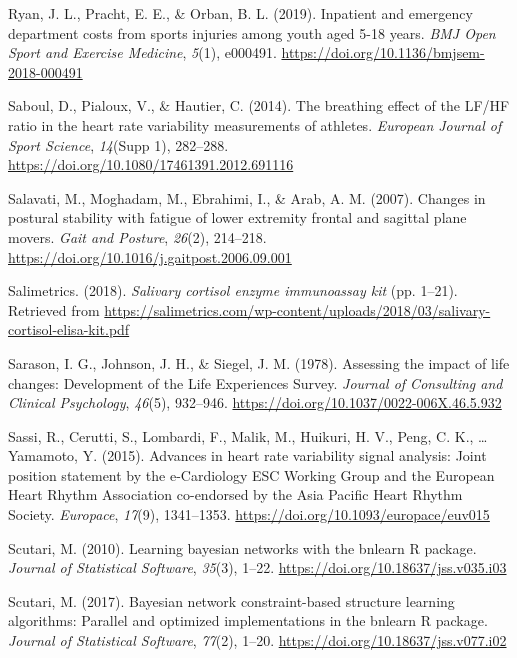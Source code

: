 \documentclass[
  english,
  man,floatsintext]{apa6}
\begin{document}
\leavevmode\hypertarget{ref-Ryan2019}{}%
Ryan, J. L., Pracht, E. E., \& Orban, B. L. (2019). Inpatient and emergency department costs from sports injuries among youth aged 5-18 years. \emph{BMJ Open Sport and Exercise Medicine}, \emph{5}(1), e000491. \url{https://doi.org/10.1136/bmjsem-2018-000491}

\leavevmode\hypertarget{ref-Saboul2014}{}%
Saboul, D., Pialoux, V., \& Hautier, C. (2014). The breathing effect of the LF/HF ratio in the heart rate variability measurements of athletes. \emph{European Journal of Sport Science}, \emph{14}(Supp 1), 282--288. \url{https://doi.org/10.1080/17461391.2012.691116}

\leavevmode\hypertarget{ref-Salavati2007}{}%
Salavati, M., Moghadam, M., Ebrahimi, I., \& Arab, A. M. (2007). Changes in postural stability with fatigue of lower extremity frontal and sagittal plane movers. \emph{Gait and Posture}, \emph{26}(2), 214--218. \url{https://doi.org/10.1016/j.gaitpost.2006.09.001}

\leavevmode\hypertarget{ref-Salimetrics2018}{}%
Salimetrics. (2018). \emph{Salivary cortisol enzyme immunoassay kit} (pp. 1--21). Retrieved from \url{https://salimetrics.com/wp-content/uploads/2018/03/salivary-cortisol-elisa-kit.pdf}

\leavevmode\hypertarget{ref-Sarason1978}{}%
Sarason, I. G., Johnson, J. H., \& Siegel, J. M. (1978). Assessing the impact of life changes: Development of the Life Experiences Survey. \emph{Journal of Consulting and Clinical Psychology}, \emph{46}(5), 932--946. \url{https://doi.org/10.1037/0022-006X.46.5.932}

\leavevmode\hypertarget{ref-Sassi2015}{}%
Sassi, R., Cerutti, S., Lombardi, F., Malik, M., Huikuri, H. V., Peng, C. K., \ldots{} Yamamoto, Y. (2015). Advances in heart rate variability signal analysis: Joint position statement by the e-Cardiology ESC Working Group and the European Heart Rhythm Association co-endorsed by the Asia Pacific Heart Rhythm Society. \emph{Europace}, \emph{17}(9), 1341--1353. \url{https://doi.org/10.1093/europace/euv015}

\leavevmode\hypertarget{ref-R-bnlearn_b}{}%
Scutari, M. (2010). Learning bayesian networks with the bnlearn R package. \emph{Journal of Statistical Software}, \emph{35}(3), 1--22. \url{https://doi.org/10.18637/jss.v035.i03}

\leavevmode\hypertarget{ref-R-bnlearn_a}{}%
Scutari, M. (2017). Bayesian network constraint-based structure learning algorithms: Parallel and optimized implementations in the bnlearn R package. \emph{Journal of Statistical Software}, \emph{77}(2), 1--20. \url{https://doi.org/10.18637/jss.v077.i02}
\end{document}

